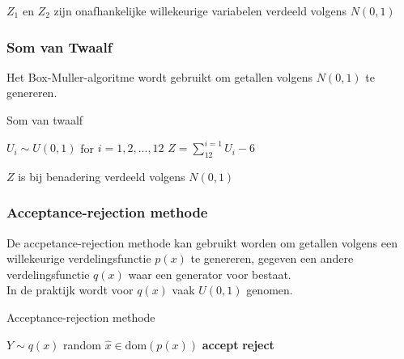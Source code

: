 \documentclass{article}
\begin{document}
	$Z_1$ en $Z_2$ zijn onafhankelijke willekeurige variabelen verdeeld volgens $N(0,1)$
	
	
	\subsubsection{Som van Twaalf}
	
	Het Box-Muller-algoritme wordt gebruikt om getallen volgens $N(0,1)$ te genereren.
	
	\begin{algorithm}[!ht]
		\caption{Som van twaalf}
		\begin{algorithmic}[1]
				\State $U_i \sim U(0,1)$ for $i=1,2,...,12$
				\State $Z = \sum_{12}^{i=1}U_i - 6$
			\EndProcedure
		\end{algorithmic}
	\end{algorithm}

	$Z$ is bij benadering verdeeld volgens $N(0,1)$
	
	\subsubsection{Acceptance-rejection methode}
	
	De accpetance-rejection methode kan gebruikt worden om getallen volgens een willekeurige verdelingsfunctie $p(x)$ te genereren, gegeven een andere verdelingsfunctie $q(x)$ waar een generator voor bestaat.\\
	
	In de praktijk wordt voor $q(x)$ vaak $U(0,1)$ genomen.
	
	\begin{algorithm}[!ht]
		\caption{Acceptance-rejection methode}
		\begin{algorithmic}[1]
				\State $Y \sim q(x)$ random
				\State $\hat{x} \in \text{dom}(p(x))$
					\State \textbf{accept}
					\State \textbf{reject}
				\EndIf
			\EndProcedure
		\end{algorithmic}
	\end{algorithm}
	
	
\end{document}
